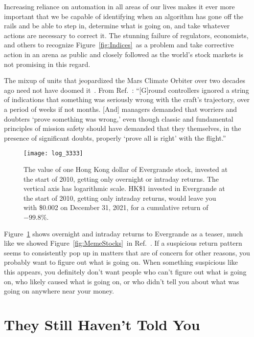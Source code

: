 \documentclass[twocolumn,twoside,prd,floatfix,letterpaper]{revtex4}
\def \lastDataDate {December 31, 2021}
\newcommand{\ldds}[1]{#1}  %
\def \FigMain {Figure~\ref{fig:Indices}}
\def \FigMeme {Figure~\ref{fig:MemeStocks}}
\begin{document}
Increasing reliance on automation in all areas of our lives makes it ever more important that we be capable of identifying when an algorithm has gone off the rails and be able to step in, determine what is going on, and take whatever actions are necessary to correct it.  The stunning failure of regulators, economists, and others to recognize \FigMain\ as a problem and take corrective action in an arena as public and closely followed as the world's stock markets is not promising in this regard.

The mixup of units that jeopardized the Mars Climate Orbiter over two decades ago need not have doomed it~\cite{MarsClimateOrbiter}.  From Ref.~\cite{MarsClimateOrbiterIEEESpectrum}:  ``[G]round controllers ignored a string of indications that something was seriously wrong with the craft's trajectory, over a period of weeks if not months.  [And] managers demanded that worriers and doubters `prove something was wrong,' even though classic and fundamental principles of mission safety should have demanded that they themselves, in the presence of significant doubts, properly `prove all is right' with the flight.''

\begin{figure}[thb]
\texttt{[image: log\_3333]}
\caption{\label{fig:Evergrande}The value of one Hong Kong dollar of Evergrande stock, invested at the start of 2010, getting only overnight or intraday returns.  The vertical axis has logarithmic scale.  HK\$1 invested in Evergrande at the start of 2010, getting only intraday returns, would leave you with \ldds{\$0.002} on \lastDataDate, for a cumulative return of \ldds{$-99.8\%$}.}
\end{figure}

Figure~\ref{fig:Evergrande} shows overnight and intraday returns to Evergrande as a teaser, much like we showed \FigMeme\ in Ref.~\cite{knuteson2021}.  If a suspicious return pattern seems to consistently pop up in matters that are of concern for other reasons, you probably want to figure out what is going on.  When something suspicious like this appears, you definitely don't want people who can't figure out what is going on, who likely caused what is going on, or who didn't tell you about what was going on anywhere near your money.


\section{They Still Haven't Told You}
\end{document}
